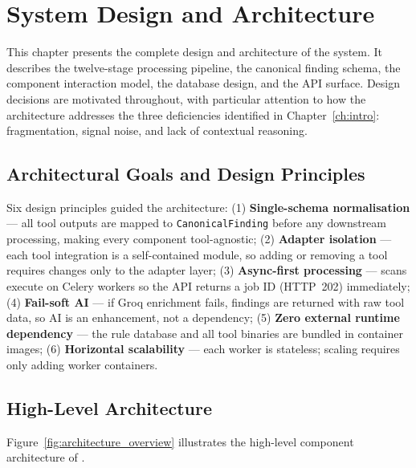 \chapter{System Design and Architecture}
\label{ch:design}

This chapter presents the complete design and architecture of the \ACRQA{} system. It describes the twelve-stage processing pipeline, the canonical finding schema, the component interaction model, the database design, and the API surface. Design decisions are motivated throughout, with particular attention to how the architecture addresses the three deficiencies identified in Chapter~\ref{ch:intro}: fragmentation, signal noise, and lack of contextual reasoning.

\section{Architectural Goals and Design Principles}
\label{sec:arch_goals}

Six design principles guided the architecture: (1) \textbf{Single-schema normalisation} — all tool outputs are mapped to \texttt{CanonicalFinding} before any downstream processing, making every component tool-agnostic; (2) \textbf{Adapter isolation} — each tool integration is a self-contained module, so adding or removing a tool requires changes only to the adapter layer; (3) \textbf{Async-first processing} — scans execute on Celery workers so the API returns a job ID (HTTP~202) immediately; (4) \textbf{Fail-soft AI} — if Groq enrichment fails, findings are returned with raw tool data, so AI is an enhancement, not a dependency; (5) \textbf{Zero external runtime dependency} — the rule database and all tool binaries are bundled in container images; (6) \textbf{Horizontal scalability} — each worker is stateless; scaling requires only adding worker containers.

\section{High-Level Architecture}
\label{sec:high_level_arch}

Figure~\ref{fig:architecture_overview} illustrates the high-level component architecture of \ACRQA{}.

